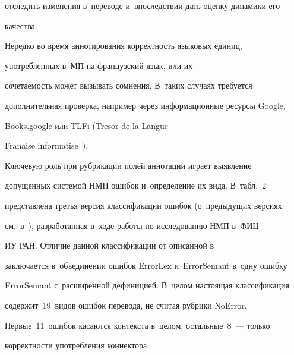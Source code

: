 отследить изменения в~переводе и~впоследствии дать оценку динамики его 


качества.


  


  


  Нередко во время аннотирования корректность языковых единиц, 


упо\-треб\-лен\-ных в~МП на французский язык, или их 


сочетаемость может вызывать сомнения. В~таких случаях требуется 


дополнительная проверка, например через информационные ресурсы Google, 


Books.google или TLFi (Tr$\acute{\mbox{e}}$sor de la Langue 


\mbox{Fran{\!\!}aise} informatis$\acute{\mbox{e}}$~\cite{22-eg}).


  


  Ключевую роль при рубрикации полей аннотации играет выявление 


допущенных системой НМП ошибок и~определение их вида. В~табл.~2 


представлена третья версия классификации ошибок (о~предыдущих версиях 


см.\ в~\cite{3-eg}), разработанная в~ходе работы по исследованию НМП в~ФИЦ 


ИУ РАН. Отличие данной классификации от описанной в~\cite{3-eg} 


заключается в~объединении ошибок ErrorLex и~ErrorSemant в~одну ошибку 


ErrorSemant с~расширенной дефиницией. В~целом настоящая классификация 


содержит~19~видов ошибок перевода, не считая руб\-ри\-ки NoError. 


Первые~11~ошибок касаются контекста в~целом, остальные~8~--- только 


корректности употребления коннектора.


  


